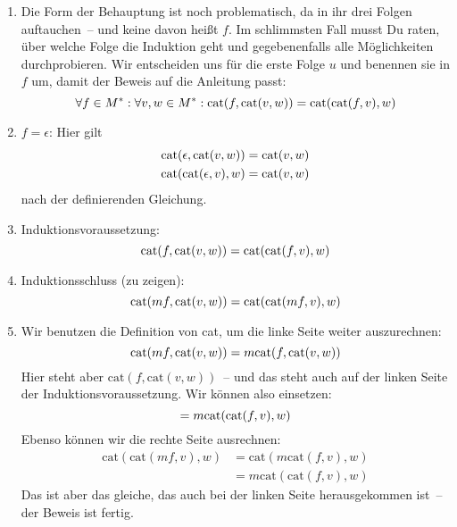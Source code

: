 \begin{enumerate}
\item Die Form der Behauptung ist noch problematisch, da in ihr drei Folgen
  auftauchen~-- und keine davon heißt $f$.  Im schlimmsten Fall musst
  Du raten, über welche Folge die Induktion geht und gegebenenfalls
  alle Möglichkeiten durchprobieren.  Wir entscheiden uns für die
  erste Folge $u$ und benennen sie in $f$ um, damit der Beweis auf die
  Anleitung passt:
  \begin{displaymath}
    \forall f\in M^\ast:\forall v,w\in M^\ast: {\rm cat}(f,{\rm cat}(v,w))  =  {\rm cat}({\rm cat}(f,v),w)
  \end{displaymath}
\item
  $f=\epsilon$: Hier gilt
  \begin{displaymath}
    \begin{split}
    {\rm cat}(\epsilon, {\rm cat}(v, w)) & = {\rm cat}(v,w)\\
    {\rm cat}({\rm cat}(\epsilon, v), w) & = {\rm cat}(v,w)
  \end{split}
\end{displaymath}
  nach der definierenden Gleichung.
\item Induktionsvoraussetzung:
%
\begin{displaymath}
  {\rm cat}(f,{\rm cat}(v,w))  = {\rm cat}({\rm cat}(f,v),w)
\end{displaymath}
%
\item Induktionsschluss (zu zeigen): 
%
\begin{displaymath}
  {\rm cat}(mf,{\rm cat}(v,w))  = {\rm cat}({\rm cat}(mf,v),w)
\end{displaymath}
%
\item Wir benutzen die Definition von cat, um die linke Seite weiter
  auszurechnen:
  \begin{displaymath}
    {\rm cat}(mf,{\rm cat}(v,w)) = m \mathrm{cat}(f,\mathrm{cat}(v, w))
  \end{displaymath}
  Hier steht aber $\mathrm{cat}(f,\mathrm{cat}(v, w))$~-- und das
  steht auch auf der linken Seite der Induktionsvoraussetzung.  Wir
  können also einsetzen:
  \begin{displaymath}
    = m {\rm cat}({\rm cat}(f,v),w)
  \end{displaymath}
  Ebenso können wir die rechte Seite ausrechnen:
  \begin{displaymath}
    \begin{split}
    \mathrm{cat}(\mathrm{cat}(mf,v),w) &=
    \mathrm{cat}(m\mathrm{cat}(f,v), w)\\ &=
    m\mathrm{cat}(\mathrm{cat}(f,v), w)
  \end{split}
\end{displaymath}  %
  Das ist aber das gleiche, das auch bei der linken Seite
  herausgekommen ist~-- der Beweis ist fertig.
\end{enumerate}


